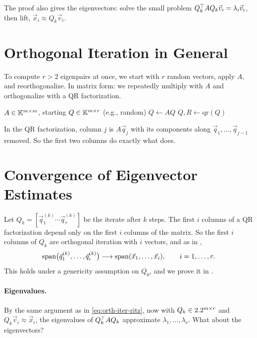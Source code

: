 The proof also gives the eigenvectors: solve the small problem $Q_k^\top AQ_k\vec{v}_i = \lambda_i\vec{v}_i$, then lift, $\vec{x}_i \approx Q_k\vec{v}_i$.

\section{Orthogonal Iteration in General}
\label{sec:orth-iter-general}

To compute $r > 2$ eigenpairs at once, we start with $r$ random vectors, apply $A$, and reorthogonalize. In matrix form: we repeatedly multiply with $A$ and orthogonalize with a QR factorization.

\begin{algorithm}[H]
  \caption{Orthogonal iteration $(A, Q)$.}
  \label{alg:orth-iter}
  \begin{algorithmic}[1]
    \Require $A \in \mathbb{K}^{m \times m}$, starting $Q \in \mathbb{K}^{m \times r}$ (e.g., random)
      \State $Q \gets AQ$ 
      \State $Q, R \gets \mathrm{qr}(Q)$ 
    \EndFor
  \end{algorithmic}
\end{algorithm}

In the QR factorization, column $j$ is $A\vec{q}_j$ with its components along $\vec{q}_1, \dots, \vec{q}_{j-1}$ removed. So the first two columns do exactly what  does.

\section{Convergence of Eigenvector Estimates}
\label{sec:orth-iter-eigvec}

Let $Q_k = [\vec{q}_1^{(k)} \cdots \vec{q}_r^{(k)}]$ be the iterate after $k$ steps. The first $i$ columns of a QR factorization depend only on the first $i$ columns of the matrix. So the first $i$ columns of $Q_k$ are orthogonal iteration with $i$ vectors, and as in ,
\begin{equation}
  \operatorname{span}\bigl(\vec{q}_1^{(k)}, \dots, \vec{q}_i^{(k)}\bigr) \longrightarrow \operatorname{span}(\vec{x}_1, \dots, \vec{x}_i), \qquad i = 1, \dots, r.
  \label{eq:orth-iter-nested}
\end{equation}
This holds under a genericity assumption on $Q_0$, and we prove it in .

\paragraph{Eigenvalues.} By the same argument as in \cref{eq:orth-iter-ritz}, now with $Q_k \in 2.2^{m \times r}$ and $Q_k\vec{v}_i \approx \vec{x}_i$, the eigenvalues of $Q_k^\top AQ_k$ approximate $\lambda_1, \dots, \lambda_r$. What about the eigenvectors?

